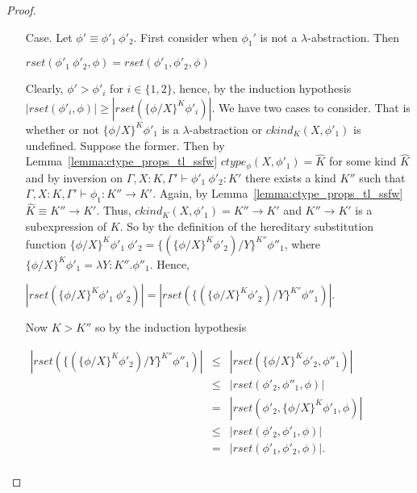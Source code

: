 \begin{proof}
\begin{itemize}
  \item[Case.] Let $\phi' \equiv \phi'_1\ \phi'_2$.  First consider when $\phi_1'$ is not a $\lambda$-abstraction. Then
    \begin{center}
      $rset(\phi'_1\ \phi'_2, \phi) = rset(\phi'_1, \phi'_2, \phi)$
    \end{center}  
    Clearly,  $\phi' > \phi'_i$ for $i \in \{1,2\}$, hence, by the induction hypothesis $|rset(\phi'_i,\phi)| \geq |rset(\{\phi/X\}^K \phi'_i)|$.  
    We have two cases to consider.  That is whether or not $\{\phi/X\}^K \phi'_1$ is a $\lambda$-abstraction or
    $ckind_K(X,\phi'_1)$ is undefined.  
    Suppose the former.
    Then by Lemma~\ref{lemma:ctype_props_tl_ssfw} $ctype_\phi(X,\phi'_1) = \hat{K}$ for some kind $\hat{K}$ and by inversion on 
    $\Gamma,X:K,\Gamma' \vdash \phi'_1\ \phi'_2:K'$
    there exists a kind $K''$ such that $\Gamma,X:K,\Gamma' \vdash \phi_1:K'' \to K'$.  Again, by Lemma~\ref{lemma:ctype_props_tl_ssfw}
    $\hat{K} \equiv K'' \to K'$. Thus, $ckind_K(X,\phi'_1) = K'' \to K'$ and $K'' \to K'$ is a subexpression of $K$.
    So by the definition of the hereditary substitution function $\{\phi/X\}^K \phi'_1\ \phi'_2 = \{(\{\phi/X\}^K \phi'_2)/Y\}^{K''} \phi''_1$, where
    $\{\phi/X\}^K \phi'_1 = \lambda Y:K''.\phi''_1$.  Hence,
    \begin{center}
      \begin{math}
        |rset(\{\phi/X\}^K \phi'_1\ \phi'_2)| = |rset(\{(\{\phi/X\}^K \phi'_2)/Y\}^{K''} \phi''_1)|.
      \end{math}
    \end{center}
    Now $K > K''$ so by the induction hypothesis 
    \begin{center}
      \begin{math}
        \begin{array}{lll}
          |rset(\{(\{\phi/X\}^K \phi'_2)/Y\}^{K''} \phi''_1)| & \leq & |rset(\{\phi/X\}^K \phi'_2, \phi''_1)|\\
          & \leq & |rset(\phi'_2, \phi''_1, \phi)|\\
          & = & |rset(\phi'_2, \{\phi/X\}^K \phi'_1, \phi)|\\
          & \leq & |rset(\phi'_2, \phi'_1, \phi)|\\
          & = & |rset(\phi'_1, \phi'_2, \phi)|.\\
        \end{array}
      \end{math}
    \end{center}
    

\end{itemize}
\end{proof}
